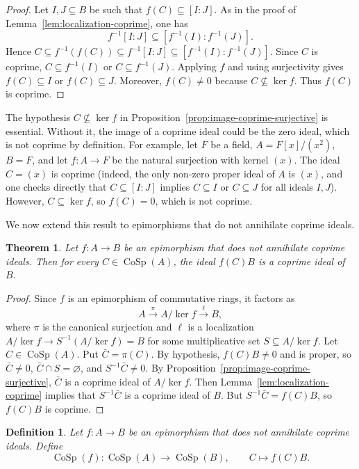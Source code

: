 \documentclass{amsart}
\newtheorem{theorem}{Theorem}
\newtheorem{definition}{Definition}
\begin{document}
\begin{proof}
Let $I,J\subseteq B$ be such that $f(C)\subseteq [I:J]$. As in the proof of Lemma~\ref{lem:localization-coprime}, one has
\[
f^{-1}[I:J]\subseteq [f^{-1}(I):f^{-1}(J)].
\]
Hence $C\subseteq f^{-1}(f(C))\subseteq f^{-1}[I:J]\subseteq [f^{-1}(I):f^{-1}(J)]$. Since $C$ is coprime, $C\subseteq f^{-1}(I)$ or $C\subseteq f^{-1}(J)$. Applying $f$ and using surjectivity gives $f(C)\subseteq I$ or $f(C)\subseteq J$. Moreover, $f(C)\neq 0$ because $C\nsubseteq \ker f$. Thus $f(C)$ is coprime.
\end{proof}

The hypothesis $C\nsubseteq \ker f$ in Proposition~\ref{prop:image-coprime-surjective} is essential. Without it, the image of a coprime ideal could be the zero ideal, which is not coprime by definition. For example, let $F$ be a field, $A = F[x]/(x^2)$, $B = F$, and let $f\colon A \to F$ be the natural surjection with kernel $(x)$. The ideal $C = (x)$ is coprime (indeed, the only non-zero proper ideal of $A$ is $(x)$, and one checks directly that $C \subseteq [I:J]$ implies $C \subseteq I$ or $C \subseteq J$ for all ideals $I,J$). However, $C \subseteq \ker f$, so $f(C) = 0$, which is not coprime.

We now extend this result to epimorphisms that do not annihilate coprime ideals.

\begin{theorem}\label{thm:image-coprime-epi}
Let $f\colon A\to B$ be an epimorphism that does not annihilate coprime ideals. Then for every $C\in\operatorname{CoSp}(A)$, the ideal $f(C)B$ is a coprime ideal of $B$.
\end{theorem}

\begin{proof}
Since $f$ is an epimorphism of commutative rings, it factors as
\[
A \xrightarrow{\ \pi\ } A/\ker f \xrightarrow{\ \ell\ } B,
\]
where $\pi$ is the canonical surjection and $\ell$ is a localization $A/\ker f\to S^{-1}(A/\ker f)=B$ for some multiplicative set $S\subseteq A/\ker f$. Let $C\in\operatorname{CoSp}(A)$. Put $\bar C=\pi(C)$. By hypothesis, $f(C)B\neq 0$ and is proper, so $\bar C\neq 0$, $\bar C\cap S=\varnothing$, and $S^{-1}\bar C\neq 0$. By Proposition~\ref{prop:image-coprime-surjective}, $\bar C$ is a coprime ideal of $A/\ker f$. Then Lemma~\ref{lem:localization-coprime} implies that $S^{-1}\bar C$ is a coprime ideal of $B$. But $S^{-1}\bar C=f(C)B$, so $f(C)B$ is coprime.
\end{proof}

\begin{definition}\label{def:cosp-functor}
Let $f\colon A\to B$ be an epimorphism that does not annihilate coprime ideals. Define
\[
\operatorname{CoSp}(f)\colon \operatorname{CoSp}(A)\longrightarrow \operatorname{CoSp}(B),
\qquad C\longmapsto f(C)B.
\]
\end{definition}
\end{document}
